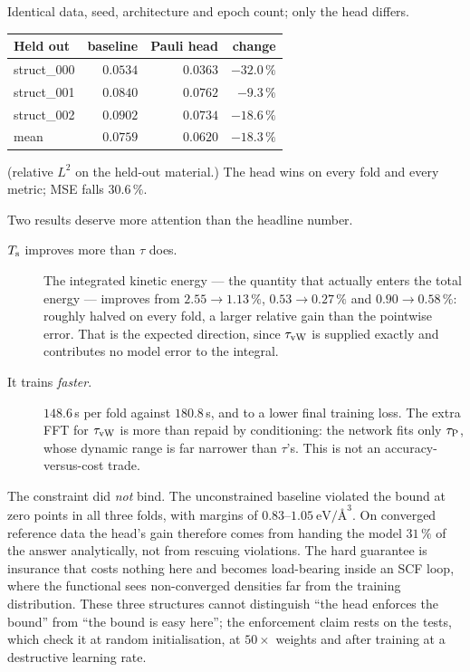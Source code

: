 Identical data, seed, architecture and epoch count; only the head differs.

\begin{center}
\begin{tabular}{@{}lrrr@{}}
\toprule
Held out & baseline & \textbf{Pauli head} & change \\
\midrule
struct\_000 & $0.0534$ & $\mathbf{0.0363}$ & $-32.0\,\%$ \\
struct\_001 & $0.0840$ & $\mathbf{0.0762}$ & $-9.3\,\%$ \\
struct\_002 & $0.0902$ & $\mathbf{0.0734}$ & $-18.6\,\%$ \\
\midrule
mean & $0.0759$ & $\mathbf{0.0620}$ & $\mathbf{-18.3\,\%}$ \\
\bottomrule
\end{tabular}
\end{center}

(relative $L^2$ on the held-out material.) The head wins on every fold and every
metric; MSE falls $30.6\,\%$.

Two results deserve more attention than the headline number.

\begin{description}
  \item[$T_{\mathrm{s}}$ improves more than $\tau$ does.] The integrated kinetic energy ---
    the quantity that actually enters the total energy --- improves from
    $2.55\to1.13\,\%$, $0.53\to0.27\,\%$ and $0.90\to0.58\,\%$: roughly halved
    on every fold, a larger relative gain than the pointwise error. That is the
    expected direction, since $\tau_{\mathrm{vW}}$ is supplied exactly and contributes no
    model error to the integral.
  \item[It trains \emph{faster}.] $148.6$\,s per fold against $180.8$\,s, and to
    a lower final training loss. The extra FFT for $\tau_{\mathrm{vW}}$ is more than repaid
    by conditioning: the network fits only $\tau_{\mathrm{P}}$, whose dynamic range is far
    narrower than $\tau$'s. This is not an accuracy-versus-cost trade.
\end{description}

\begin{pwarn}
The constraint did \emph{not} bind. The unconstrained baseline violated the
bound at zero points in all three folds, with margins of $0.83$--$1.05\
\mathrm{eV}/\text{\AA}^3$. On converged reference data the head's gain therefore
comes from handing the model $31\,\%$ of the answer analytically, not from
rescuing violations. The hard guarantee is insurance that costs nothing here and
becomes load-bearing inside an SCF loop, where the functional sees
non-converged densities far from the training distribution. These three
structures cannot distinguish ``the head enforces the bound'' from ``the bound
is easy here''; the enforcement claim rests on the tests, which check it at
random initialisation, at $50\times$ weights and after training at a
destructive learning rate.
\end{pwarn}

